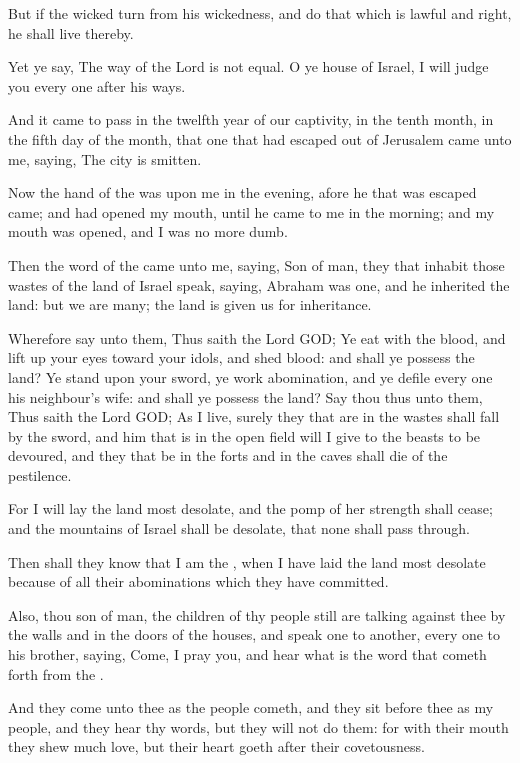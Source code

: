 \Verse But if the wicked turn from his wickedness, and do that which is lawful and right, he shall live thereby.

\Verse Yet ye say, The way of the Lord is not equal. O ye house of Israel, I will judge you every one after his ways.

\Verse And it came to pass in the twelfth year of our captivity, in the tenth month, in the fifth day of the month, that one that had escaped out of Jerusalem came unto me, saying, The city is smitten.

\Verse Now the hand of the \LORD was upon me in the evening, afore he that was escaped came; and had opened my mouth, until he came to me in the morning; and my mouth was opened, and I was no more dumb.

\Verse Then the word of the \LORD came unto me, saying, \Verse Son of man, they that inhabit those wastes of the land of Israel speak, saying, Abraham was one, and he inherited the land: but we are many; the land is given us for inheritance.

\Verse Wherefore say unto them, Thus saith the Lord GOD; Ye eat with the blood, and lift up your eyes toward your idols, and shed blood: and shall ye possess the land?  \Verse Ye stand upon your sword, ye work abomination, and ye defile every one his neighbour's wife: and shall ye possess the land?  \Verse Say thou thus unto them, Thus saith the Lord GOD; As I live, surely they that are in the wastes shall fall by the sword, and him that is in the open field will I give to the beasts to be devoured, and they that be in the forts and in the caves shall die of the pestilence.

\Verse For I will lay the land most desolate, and the pomp of her strength shall cease; and the mountains of Israel shall be desolate, that none shall pass through.

\Verse Then shall they know that I am the \LORD, when I have laid the land most desolate because of all their abominations which they have committed.

\Verse Also, thou son of man, the children of thy people still are talking against thee by the walls and in the doors of the houses, and speak one to another, every one to his brother, saying, Come, I pray you, and hear what is the word that cometh forth from the \LORD.

\Verse And they come unto thee as the people cometh, and they sit before thee as my people, and they hear thy words, but they will not do them: for with their mouth they shew much love, but their heart goeth after their covetousness.

